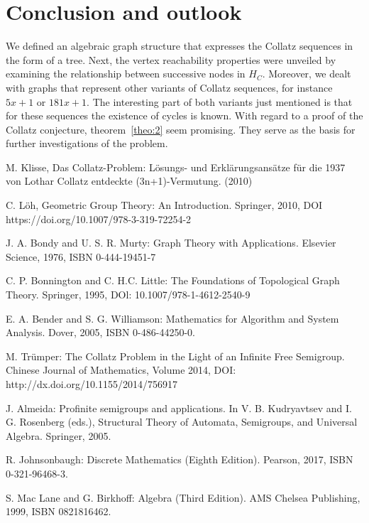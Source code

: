 \documentclass{SciPress_2015}
\begin{document}
\section{Conclusion and outlook}
We defined an algebraic graph structure that expresses the Collatz sequences in the form of a tree. Next, the vertex reachability properties were unveiled by examining the relationship between successive nodes in $H_C$. Moreover, we dealt with graphs that represent other variants of Collatz sequences, for instance $5x+1$ or $181x+1$. The interesting part of both variants just mentioned is that for these sequences the existence of cycles is known. With regard to a proof of the Collatz conjecture, theorem~\ref{theo:2} seem promising. They serve as the basis for further investigations of the problem.


\begin{thebibliography}{99}

M. Klisse, Das Collatz-Problem: L\"osungs- und Erkl\"arungsans\"atze f\"ur 
die 1937 von Lothar Collatz entdeckte (3n+1)-Vermutung. (2010)

C. Löh, Geometric Group Theory: An Introduction. Springer, 2010, DOI
https://doi.org/10.1007/978-3-319-72254-2

J. A. Bondy and U. S. R. Murty: Graph Theory with Applications. Elsevier
Science, 1976, ISBN 0-444-19451-7

C. P. Bonnington and C. H.C. Little: The Foundations of Topological
Graph Theory. Springer, 1995, DOl: 10.1007/978-1-4612-2540-9

E. A. Bender and S. G. Williamson: Mathematics for Algorithm and System
Analysis. Dover, 2005, ISBN 0-486-44250-0.

M. Tr\"umper: The Collatz Problem in the Light of an Infinite Free
Semigroup. Chinese Journal of Mathematics, Volume 2014, DOI:
http://dx.doi.org/10.1155/2014/756917

J. Almeida: Profinite semigroups and applications. In V. B. Kudryavtsev
and I. G. Rosenberg (eds.), Structural Theory of Automata, Semigroups,
and Universal Algebra. Springer, 2005.

R. Johnsonbaugh: Discrete Mathematics (Eighth Edition).
Pearson, 2017, ISBN 0-321-96468-3.

S. Mac Lane and G. Birkhoff: Algebra (Third Edition). AMS Chelsea
Publishing, 1999, ISBN 0821816462.


\end{thebibliography}
\end{document}
